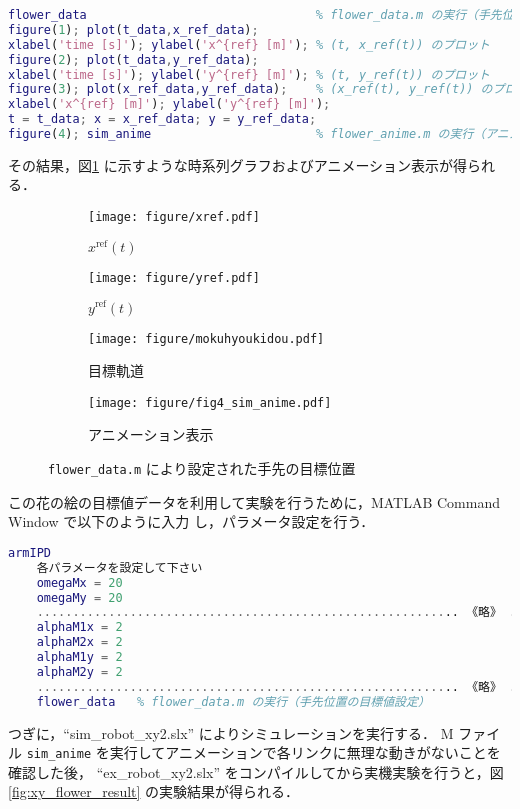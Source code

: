 \begin{lstlisting}[language=Matlab]
flower_data                                % flower_data.m の実行（手先位置の目標値設定）
figure(1); plot(t_data,x_ref_data); 
xlabel('time [s]'); ylabel('x^{ref} [m]'); % (t, x_ref(t)) のプロット
figure(2); plot(t_data,y_ref_data); 
xlabel('time [s]'); ylabel('y^{ref} [m]'); % (t, y_ref(t)) のプロット
figure(3); plot(x_ref_data,y_ref_data);    % (x_ref(t), y_ref(t)) のプロット
xlabel('x^{ref} [m]'); ylabel('y^{ref} [m]');
t = t_data; x = x_ref_data; y = y_ref_data;
figure(4); sim_anime                       % flower_anime.m の実行（アニメーション）
\end{lstlisting}

その結果，図\ref{fig:xy_flower} に示すような時系列グラフおよびアニメーション表示が得られる．

\begin{figure}[H]
    \centering
    \begin{subfigure}[b]{0.45\linewidth}
        \centering
        \texttt{[image: figure/xref.pdf]}
        \caption{$x^{\mathrm{ref}}(t)$}
    \end{subfigure}
    \begin{subfigure}[b]{0.45\linewidth}
        \centering
        \texttt{[image: figure/yref.pdf]}
        \caption{$y^{\mathrm{ref}}(t)$}
    \end{subfigure}

    \begin{subfigure}[b]{0.45\linewidth}
        \centering
        \texttt{[image: figure/mokuhyoukidou.pdf]}
        \caption{目標軌道}
    \end{subfigure}
    \begin{subfigure}[b]{0.45\linewidth}
        \centering
        \texttt{[image: figure/fig4\_sim\_anime.pdf]}
        \caption{アニメーション表示}
    \end{subfigure}
    \caption{\texttt{flower\_data.m} により設定された手先の目標位置}
    \label{fig:xy_flower}
\end{figure}

この花の絵の目標値データを利用して実験を行うために，MATLAB Command Window で以下のように入力
し，パラメータ設定を行う．
\begin{lstlisting}[language=Matlab]
    armIPD
    各パラメータを設定して下さい
    omegaMx = 20
    omegaMy = 20
    ........................................................... 《略》 ...........................................................
    alphaM1x = 2
    alphaM2x = 2
    alphaM1y = 2
    alphaM2y = 2
    ........................................................... 《略》 ...........................................................
    flower_data   % flower_data.m の実行（手先位置の目標値設定）
\end{lstlisting}
つぎに，``sim\_robot\_xy2.slx'' によりシミュレーションを実行する．
M ファイル \texttt{sim\_anime} を実行してアニメーションで各リンクに無理な動きがないことを確認した後，
``ex\_robot\_xy2.slx'' をコンパイルしてから実機実験を行うと，図\ref{fig:xy_flower_result} の実験結果が得られる．

